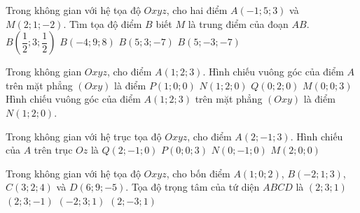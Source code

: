 \begin{ex}%
	Trong không gian với hệ tọa độ $ Oxyz $, cho hai điểm $ A(-1;5;3) $ và $ M(2;1;-2) $. Tìm tọa độ điểm $ B $ biết $ M $ là trung điểm của đoạn $ AB $.
	\choice
	{$ B\left(\dfrac{1}{2};3;\dfrac{1}{2}\right) $}
	{$ B(-4;9;8) $}
	{$ B(5;3;-7) $}
	{\True $ B(5;-3;-7) $}
\end{ex}
\begin{ex}%
	Trong không gian $Oxyz$, cho điểm $A(1;2;3)$. Hình chiếu vuông góc của điểm $A$ trên mặt phẳng $(Oxy)$ là điểm
	\choice
	{$P(1;0;0)$}
	{\True $N(1;2;0)$}
	{$Q(0;2;0)$}
	{$M(0;0;3)$}
	\loigiai
	{
		Hình chiếu vuông góc của điểm $A(1;2;3)$ trên mặt phẳng $(Oxy)$ là điểm $N(1;2;0)$.
	}
\end{ex}
\begin{ex}%
	Trong không gian với hệ trục tọa độ $Oxyz$, cho điểm $A(2;-1;3)$. Hình chiếu của $A$ trên trục $Oz$ là
	\choice
	{$Q(2;-1;0)$}
	{\True $P(0;0;3)$}
	{$N(0;-1;0)$}
	{$M(2;0;0)$}
\end{ex}
\begin{ex}%
	Trong không gian với hệ tọa độ $Oxyz$, cho bốn điểm $A(1;0;2)$, $B(-2;1;3)$, $C(3;2;4)$ và $D(6;9;-5)$. Tọa độ trọng tâm của tứ diện $ABCD$ là
	\choice
	{\True $(2;3;1)$}
	{$(2;3;-1)$}
	{$(-2;3;1)$}
	{$(2;-3;1)$}
\end{ex}
